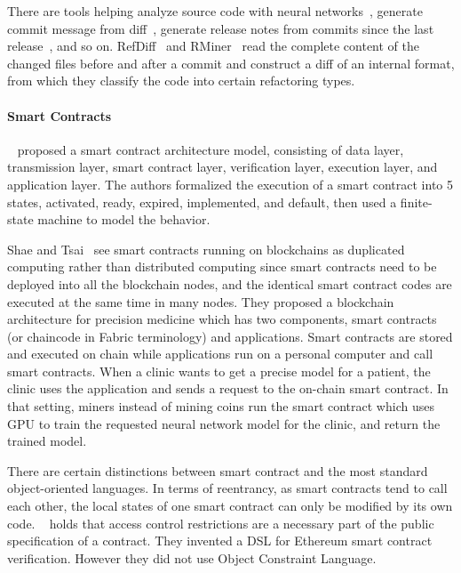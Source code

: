 There are tools helping analyze source code with neural networks~\cite{morgachev2019detection,huo2016learning,gu2016deep},
generate commit message from diff~\cite{linares2015changescribe,buse2010automatically,huang2020learning},
generate release notes from commits since the last release~\cite{moreno2016arena}, and so on.
RefDiff~\cite{silva2020refdiff} and RMiner~\cite{tsantalis2018accurate} read the complete content of the changed files before and after a commit and construct a diff of an internal format, from which they classify the code into certain refactoring types.

\paragraph*{Smart Contracts}

~\cite{yang2020implementation} proposed a smart contract architecture model, consisting of data layer, transmission layer, smart contract layer, verification layer, execution layer, and application layer. The authors formalized the execution of a smart contract into 5 states, activated, ready, expired, implemented, and default, then used a finite-state machine to model the behavior.

Shae and Tsai~\cite{shae2018transform} see smart contracts running on blockchains as duplicated computing rather than distributed computing
since smart contracts need to be deployed into all the blockchain nodes, and the identical smart contract codes are executed at the same time in many nodes.
They proposed a blockchain architecture for precision medicine which has two components, smart contracts (or chaincode in Fabric terminology) and applications.
Smart contracts are stored and executed on chain while applications run on a personal computer and call smart contracts.
When a clinic wants to get a precise model for a patient, the clinic uses the application and sends a request to the on-chain smart contract. In that setting, miners instead of mining coins run the smart contract which uses GPU to train the requested neural network model for the clinic, and return the trained model.


There are certain distinctions between smart contract and the most standard object-oriented languages. In terms of reentrancy, as smart contracts tend to call each other, the local states of one smart contract can only be modified by its own code.
~\cite{bram2021rich} holds that access control restrictions are a necessary part of the public specification of a contract. They invented a DSL for Ethereum smart contract verification. However they did not use Object Constraint Language.


